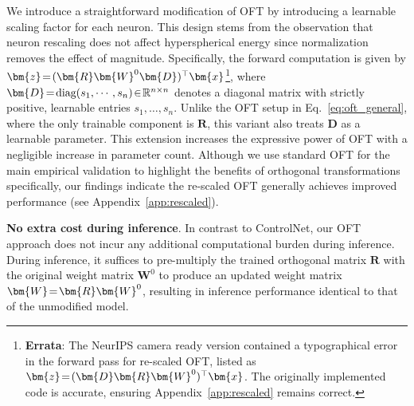 \begin{itemize}[leftmargin=*,nosep]
We introduce a straightforward modification of OFT by introducing a learnable scaling factor for each neuron. This design stems from the observation that neuron rescaling does not affect hyperspherical energy since normalization removes the effect of magnitude. Specifically, the forward computation is given by $\thickmuskip=2mu \medmuskip=2mu\bm{z}=(\bm{R}\bm{W}^0\bm{D})^\top\bm{x}$\footnote{\textbf{Errata}: The NeurIPS camera ready version contained a typographical error in the forward pass for re-scaled OFT, listed as $\thickmuskip=2mu \medmuskip=2mu\bm{z}=(\bm{D}\bm{R}\bm{W}^0)^\top\bm{x}$. The originally implemented code is accurate, ensuring Appendix~\ref{app:rescaled} remains correct.}, where $\thickmuskip=2mu \medmuskip=2mu\bm{D}=\text{diag}(s_1,\cdots,s_n)\in\mathbb{R}^{n\times n}$ denotes a diagonal matrix with strictly positive, learnable entries $s_1,\ldots,s_n$. Unlike the OFT setup in Eq.~\eqref{eq:oft_general}, where the only trainable component is $\bm{R}$, this variant also treats $\bm{D}$ as a learnable parameter. This extension increases the expressive power of OFT with a negligible increase in parameter count. Although we use standard OFT for the main empirical validation to highlight the benefits of orthogonal transformations specifically, our findings indicate the re-scaled OFT generally achieves improved performance (see Appendix~\ref{app:rescaled}).

\textbf{No extra cost during inference}. In contrast to ControlNet, our OFT approach does not incur any additional computational burden during inference. During inference, it suffices to pre-multiply the trained orthogonal matrix $\bm{R}$ with the original weight matrix $\bm{W}^0$ to produce an updated weight matrix $\thickmuskip=2mu \medmuskip=2mu \bm{W}=\bm{R}\bm{W}^0$, resulting in inference performance identical to that of the unmodified model.


\end{itemize}
